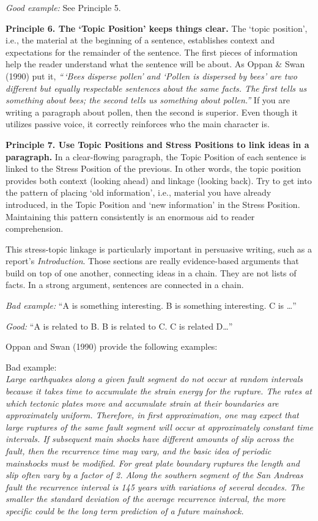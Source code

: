 \documentclass[
]{book}
\begin{document}
\emph{Good example:} See Principle 5.

\textbf{Principle 6. The `Topic Position' keeps things clear.} The `topic position', i.e., the material at the beginning of a sentence, establishes context and expectations for the remainder of the sentence. The first pieces of information help the reader understand what the sentence will be about. As Oppan \& Swan (1990) put it, \emph{``\,`Bees disperse pollen' and `Pollen is dispersed by bees' are two different but equally respectable sentences about the same facts. The first tells us something about bees; the second tells us something about pollen.''} If you are writing a paragraph about pollen, then the second is superior. Even though it utilizes passive voice, it correctly reinforces who the main character is.

\textbf{Principle 7. Use Topic Positions and Stress Positions to link ideas in a paragraph.} In a clear-flowing paragraph, the Topic Position of each sentence is linked to the Stress Position of the previous. In other words, the topic position provides both context (looking ahead) and linkage (looking back). Try to get into the pattern of placing `old information', i.e., material you have already introduced, in the Topic Position and `new information' in the Stress Position. Maintaining this pattern consistently is an enormous aid to reader comprehension.

This stress-topic linkage is particularly important in persuasive writing, such as a report's \emph{Introduction}. Those sections are really evidence-based arguments that build on top of one another, connecting ideas in a chain. They are not lists of facts.
In a strong argument, sentences are connected in a chain.

\emph{Bad example:} ``A is something interesting. B is something interesting. C is \ldots{}''

\emph{Good:} ``A is related to B. B is related to C. C is related D\ldots{}''

Oppan and Swan (1990) provide the following examples:

Bad example:\\
\emph{Large earthquakes along a given fault segment do not occur at random intervals because it takes time to accumulate the strain energy for the rupture. The rates at which tectonic plates move and accumulate strain at their boundaries are approximately uniform. Therefore, in first approximation, one may expect that large ruptures of the same fault segment will occur at approximately constant time intervals. If subsequent main shocks have different amounts of slip across the fault, then the recurrence time may vary, and the basic idea of periodic mainshocks must be modified. For great plate boundary ruptures the length and slip often vary by a factor of 2. Along the southern segment of the San Andreas fault the recurrence interval is 145 years with variations of several decades. The smaller the standard deviation of the average recurrence interval, the more specific could be the long term prediction of a future mainshock.}
\end{document}
